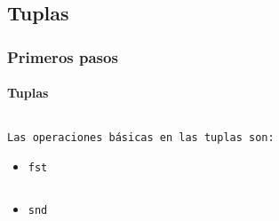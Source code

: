 \subsection{Tuplas}
\begin{frame}[fragile]
  \frametitle{Primeros pasos}
  \framesubtitle{Tuplas}
  {\color{white}
    \inputminted[bgcolor=bg]{haskell}{code/tuplas01.hs}
  }
  \texttt{Las operaciones básicas en las tuplas son:}
  \begin{itemize}
  \item \verb~fst~
    {\color{white}
      \inputminted[bgcolor=bg]{text}{code/tuplas02.txt}
    }
  \item \verb~snd~
    {\color{white}
      \inputminted[bgcolor=bg]{text}{code/tuplas03.txt}
    }
  \end{itemize}
\end{frame}
